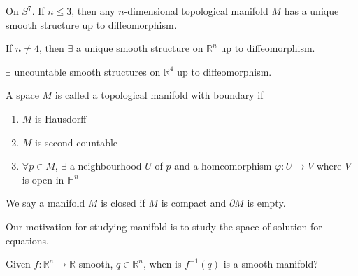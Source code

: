 \begin{theorem}
    On  $ S^7  $. If  $ n \leq 3  $, then any  $ n  $-dimensional topological manifold  $ M  $ has a unique smooth structure up to diffeomorphism.
\end{theorem}
\begin{theorem}[Stallings]
    If  $ n\not=4  $, then  $ \exists  $ a unique smooth structure on  $ \mathbb{R}^n  $ up to diffeomorphism.
\end{theorem}
\begin{theorem}
     $ \exists  $ uncountable smooth structures on  $ \mathbb{R}^4 $ up to diffeomorphism. 
\end{theorem}
\begin{definition}
    A space  $ M  $ is called a topological manifold with boundary if 
    \begin{enumerate}
        \item  $ M  $ is Hausdorff
        \item  $ M  $ is second countable 
        \item  $ \forall  p\in M $,  $ \exists   $ a neighbourhood  $ U  $ of  $ p  $ and a homeomorphism  $ \varphi:U\rightarrow V    $  where  $ V  $ is open in  $ \mathbb{H}^n $ 
    \end{enumerate}
    We say a manifold  $ M  $ is closed if  $ M  $ is compact and  $ \partial M  $ is empty.
\end{definition}
Our motivation for studying manifold is to study the space of solution for equations.
\begin{question}
    Given  $ f:\mathbb{R}^n\rightarrow \mathbb{R} $ smooth,  $ q\in \mathbb{R}^n $, when is  $ f^{-1}(q)  $ is a smooth manifold?
\end{question}

